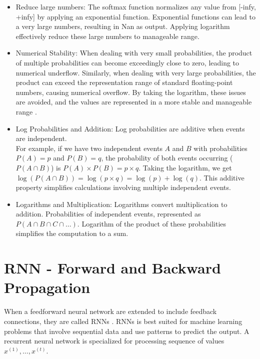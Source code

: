 \begin{itemize}
    \item Reduce large numbers:  The softmax function normalizes any value from [-infy, +infy] by applying an exponential function. Exponential functions can lead to a very large numbers, resulting in  Nan as output. Applying logarithm effectively reduce these large numbers to manageable range.
    \item Numerical Stability: When dealing with very small probabilities, the product of multiple probabilities can become exceedingly close to zero, leading to numerical underflow. Similarly, when dealing with very large probabilities, the product can exceed the representation range of standard floating-point numbers, causing numerical overflow. By taking the logarithm, these issues are avoided, and the values are represented in a more stable and manageable range \parencite[Page 79]{Goodfellow-et-al-2016}.
    
    \item Log Probabilities and Addition: Log probabilities are additive when events are independent.\\ For example, if we have two independent events \(A\) and \(B\) with probabilities \(P(A) = p\) and \(P(B) = q\), the probability of both events occurring (\(P(A \cap B)\)) is \(P(A) \times P(B) = p \times q\). Taking the logarithm, we get \(\log(P(A \cap B)) = \log(p \times q) = \log(p) + \log(q)\). This additive property simplifies calculations involving multiple independent events.

    \item Logarithms and Multiplication: Logarithms convert multiplication to addition. Probabilities of independent events,  represented as \(P(A \cap B \cap C \cap \ldots)\). Logarithm of the product of these probabilities simplifies the computation to a sum. 
\end{itemize}

\section{ \acs*{RNN} - Forward and Backward Propagation}

When a feedforward neural network are extended to include feedback connections, they are called \acfp{RNN} \parencite[Chapter 6, Page 164]{Goodfellow-et-al-2016}. \acfp{RNN} \parencite{Rumelhart.1986} is best suited for machine learning problems that involve sequential data and use patterns to predict the output. A recurrent neural network is specialized for processing sequence of values $ x^{(1)},\ldots,x^{(t)}$.

